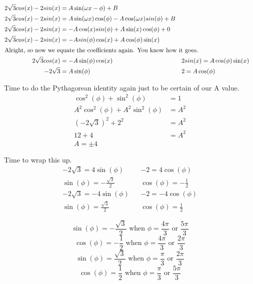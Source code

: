\documentclass[10pt,letterpaper]{amspset}
\begin{document}
\begin{solution}
    \begin{align}
        2\sqrt{3}cos(x) - 2sin(x) &= A \sin(\omega x - \phi) + B \\
        2\sqrt{3}cos(x) - 2sin(x) &= A \sin(\omega x) \cos(\phi) - A \cos(\omega x) sin(\phi) + B \\
        2\sqrt{3}cos(x) - 2sin(x) &= - A \cos(x) sin(\phi) + A \sin(x) \cos(\phi) + 0 \\
        2\sqrt{3}cos(x) - 2sin(x) &= - A sin(\phi) \cos(x) + A \cos(\phi) \sin(x) \\
        \intertext{Alright, so now we equate the coefficients again. You know how it goes.}
        2\sqrt{3}cos(x) &= - A \sin(\phi) \cos(x)  && 2sin(x) = A \cos(\phi) \sin(x) \\
        -2\sqrt{3} &= A\sin(\phi) && 2 = A\cos(\phi) \\
    \end{align}
        
        Time to do the Pythagorean identity again just to be certain of our A value.
    \begin{align}
        \cos^2(\phi) + \sin^2(\phi) &= 1 \\
        A^2\cos^2(\phi) + A^2\sin^2(\phi) &= A^2 \\
        (-2\sqrt{3})^2 + 2^2 &= A^2 \\
        12 + 4 &= A^2 \\
        A = \pm 4
    \end{align}
    
    \pagebreak
    
    Time to wrap this up. 
    \begin{align}
        -2\sqrt{3} = 4\sin(\phi) && -2 = 4\cos(\phi) \\
        \sin(\phi) = -\frac{\sqrt{3}}{2} && \cos(\phi) = -\frac{1}{2} \\
        -2\sqrt{3} = -4\sin(\phi) && -2 = -4\cos(\phi) \\
        \sin(\phi) = \frac{\sqrt{3}}{2} && \cos(\phi) = \frac{1}{2}
    \end{align}
    
    \[ \sin(\phi) = -\frac{\sqrt{3}}{2} \text{  when  } \phi = \frac{4\pi}{3} \text{  or  } \frac{5\pi}{3}\]
    \[ \cos(\phi) = -\frac{1}{2} \text{  when  } \phi = \frac{4\pi}{3} \text{  or  } \frac{2\pi}{3}\]
    \[ \sin(\phi) = \frac{\sqrt{3}}{2} \text{  when  } \phi = \frac{\pi}{3} \text{  or  } \frac{2\pi}{3}\]
    \[ \cos(\phi) = \frac{1}{2} \text{  when  } \phi = \frac{\pi}{3} \text{  or  } \frac{5\pi}{3}\]


\end{solution}
\end{document}
